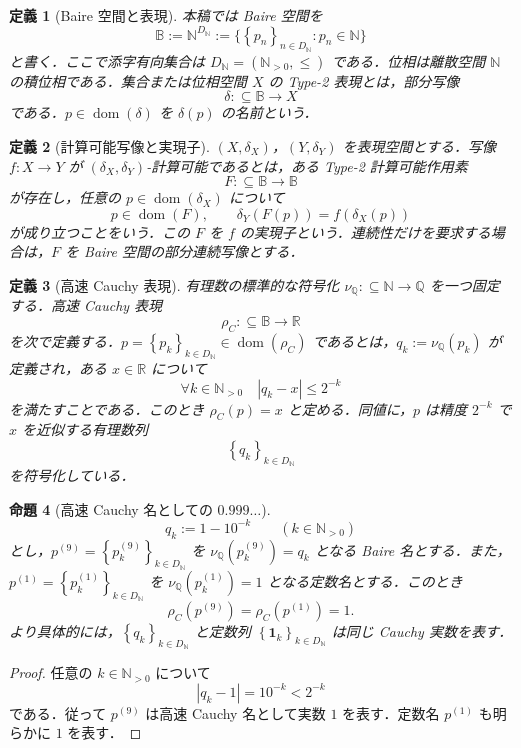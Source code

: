 \documentclass[a4paper,11pt]{ltjsarticle}
\theoremstyle{jpdef}
\newtheorem{definition}{定義}[section]
\theoremstyle{jpthm}
\newtheorem{proposition}[definition]{命題}
\newcommand{\N}{\mathbb{N}}
\newcommand{\Q}{\mathbb{Q}}
\newcommand{\R}{\mathbb{R}}
\newcommand{\dom}{\operatorname{dom}}
\newcommand{\DN}{D_{\N}}
\newcommand{\seq}[2]{\left\{#1\right\}_{#2}}
\newcommand{\Baire}{\mathbb{B}}
\newcommand{\defeq}{:=}
\begin{document}
\begin{definition}[Baire 空間と表現]
本稿では Baire 空間を
\[
  \Baire := \N^{\DN}
  \defeq \{\seq{p_n}{n\in\DN}:p_n\in\N\}
\]
と書く．ここで添字有向集合は \(\DN=(\N_{>0},\le)\) である．位相は離散空間 \(\N\) の積位相である．集合または位相空間 \(X\) の Type-2 表現とは，部分写像
\[
  \delta:\subseteq \Baire\to X
\]
である．\(p\in\dom(\delta)\) を \(\delta(p)\) の名前という．
\end{definition}

\begin{definition}[計算可能写像と実現子]
\((X,\delta_X)\)，\((Y,\delta_Y)\) を表現空間とする．写像 \(f:X\to Y\) が \((\delta_X,\delta_Y)\)-計算可能であるとは，ある Type-2 計算可能作用素
\[
  F:\subseteq\Baire\to\Baire
\]
が存在し，任意の \(p\in\dom(\delta_X)\) について
\[
  p\in\dom(F),\qquad \delta_Y(F(p))=f(\delta_X(p))
\]
が成り立つことをいう．この \(F\) を \(f\) の実現子という．連続性だけを要求する場合は，\(F\) を Baire 空間の部分連続写像とする．
\end{definition}

\begin{definition}[高速 Cauchy 表現]
有理数の標準的な符号化 \(\nu_{\Q}:\subseteq\N\to\Q\) を一つ固定する．高速 Cauchy 表現
\[
  \rho_C:\subseteq\Baire\to\R
\]
を次で定義する．\(p=\seq{p_k}{k\in\DN}\in\dom(\rho_C)\) であるとは，\(q_k:=\nu_{\Q}(p_k)\) が定義され，ある \(x\in\R\) について
\[
  \forall k\in\N_{>0}\quad |q_k-x|\le 2^{-k}
\]
を満たすことである．このとき \(\rho_C(p)=x\) と定める．同値に，\(p\) は精度 \(2^{-k}\) で \(x\) を近似する有理数列
\[
  \seq{q_k}{k\in\DN}
\]
を符号化している．
\end{definition}

\begin{proposition}[高速 Cauchy 名としての \(0.999\ldots\)]
\[
  q_k:=1-10^{-k}\qquad(k\in\N_{>0})
\]
とし，\(p^{(9)}=\seq{p^{(9)}_k}{k\in\DN}\) を \(\nu_{\Q}(p^{(9)}_k)=q_k\) となる Baire 名とする．また，\(p^{(1)}=\seq{p^{(1)}_k}{k\in\DN}\) を \(\nu_{\Q}(p^{(1)}_k)=1\) となる定数名とする．このとき
\[
  \rho_C(p^{(9)})=\rho_C(p^{(1)})=1.
\]
より具体的には，\(\seq{q_k}{k\in\DN}\) と定数列 \(\seq{\mathbf1_k}{k\in\DN}\) は同じ Cauchy 実数を表す．
\end{proposition}

\begin{proof}
任意の \(k\in\N_{>0}\) について
\[
  |q_k-1|=10^{-k}<2^{-k}
\]
である．従って \(p^{(9)}\) は高速 Cauchy 名として実数 \(1\) を表す．定数名 \(p^{(1)}\) も明らかに \(1\) を表す．
\end{proof}
\end{document}
